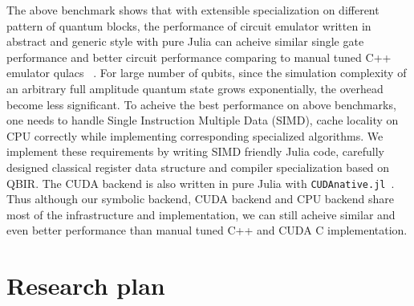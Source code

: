 \documentclass[]{article}
\begin{document}
The above benchmark shows that with extensible specialization on different pattern of quantum blocks, the performance of
circuit emulator written in abstract and generic style with pure Julia can acheive similar single gate performance and
better circuit performance comparing to manual tuned C++ emulator qulacs~\cite{qulacs2019variational} . For large number of qubits, since the
simulation complexity of an arbitrary full amplitude quantum state grows exponentially, the overhead become less significant.
To acheive the best performance on above benchmarks, one needs to handle Single Instruction
Multiple Data (SIMD), cache locality on CPU correctly while implementing corresponding specialized algorithms.
We implement these requirements by writing SIMD friendly Julia code, carefully designed classical register data structure and
compiler specialization based on QBIR. The CUDA backend is also written in pure Julia with \texttt{CUDAnative.jl}~\cite{besard2018effective}.
Thus although our symbolic backend, CUDA backend and CPU backend share most of the infrastructure and
implementation, we can still acheive similar and even better performance than manual tuned C++ and CUDA C implementation.


\section{Research plan}
\end{document}
